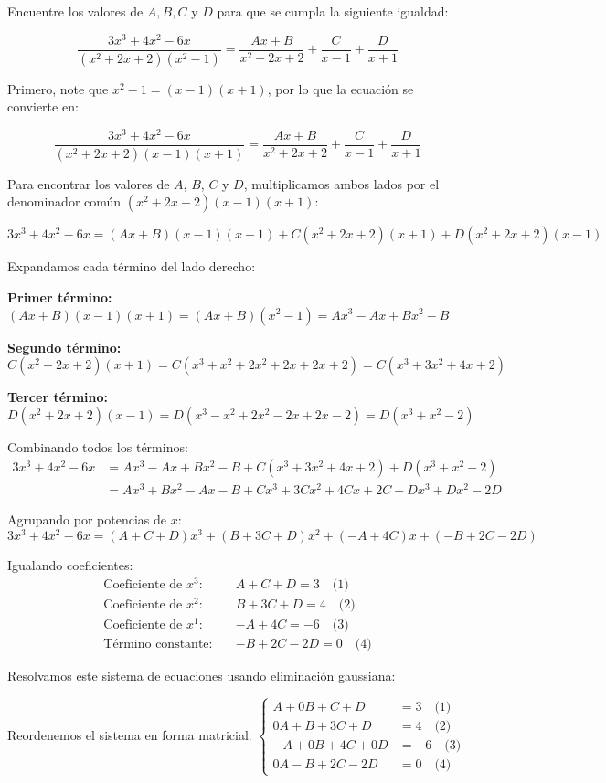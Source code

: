 \begin{prob} Encuentre los valores de $A, B, C$ y $D$ para que se cumpla la siguiente igualdad:

$$\dfrac{3x^3+4x^2-6x}{(x^2+2x+2)(x^2-1)}=\dfrac{Ax+B}{x^2+2x+2}+\dfrac{C}{x-1}+\dfrac{D}{x+1}$$

\begin{myproof}
Primero, note que $x^2-1 = (x-1)(x+1)$, por lo que la ecuación se convierte en:

$$\frac{3x^3+4x^2-6x}{(x^2+2x+2)(x-1)(x+1)}=\frac{Ax+B}{x^2+2x+2}+\frac{C}{x-1}+\frac{D}{x+1}$$

Para encontrar los valores de $A$, $B$, $C$ y $D$, multiplicamos ambos lados por el denominador común $(x^2+2x+2)(x-1)(x+1)$:

$$3x^3+4x^2-6x = (Ax+B)(x-1)(x+1) + C(x^2+2x+2)(x+1) + D(x^2+2x+2)(x-1)$$

Expandamos cada término del lado derecho:

\textbf{Primer término:} $(Ax+B)(x-1)(x+1) = (Ax+B)(x^2-1) = Ax^3 - Ax + Bx^2 - B$

\textbf{Segundo término:} $C(x^2+2x+2)(x+1) = C(x^3+x^2+2x^2+2x+2x+2) = C(x^3+3x^2+4x+2)$

\textbf{Tercer término:} $D(x^2+2x+2)(x-1) = D(x^3-x^2+2x^2-2x+2x-2) = D(x^3+x^2-2)$

Combinando todos los términos:
\begin{align*}
3x^3+4x^2-6x &= Ax^3 - Ax + Bx^2 - B + C(x^3+3x^2+4x+2) + D(x^3+x^2-2)\\
&= Ax^3 + Bx^2 - Ax - B + Cx^3 + 3Cx^2 + 4Cx + 2C + Dx^3 + Dx^2 - 2D
\end{align*}

Agrupando por potencias de $x$:
$$3x^3+4x^2-6x = (A+C+D)x^3 + (B+3C+D)x^2 + (-A+4C)x + (-B+2C-2D)$$

Igualando coeficientes:
\begin{align*}
\text{Coeficiente de } x^3: \quad &A + C + D = 3 \quad \text{(1)}\\
\text{Coeficiente de } x^2: \quad &B + 3C + D = 4 \quad \text{(2)}\\
\text{Coeficiente de } x^1: \quad &-A + 4C = -6 \quad \text{(3)}\\
\text{Término constante}: \quad &-B + 2C - 2D = 0 \quad \text{(4)}
\end{align*}

Resolvamos este sistema de ecuaciones usando eliminación gaussiana:

Reordenemos el sistema en forma matricial: $
\begin{cases}
A + 0B + C + D &= 3 \quad \text{(1)}\\
0A + B + 3C + D &= 4 \quad \text{(2)}\\
-A + 0B + 4C + 0D &= -6 \quad \text{(3)}\\
0A - B + 2C - 2D &= 0 \quad \text{(4)}
\end{cases}$


\end{myproof}
\end{prob}
